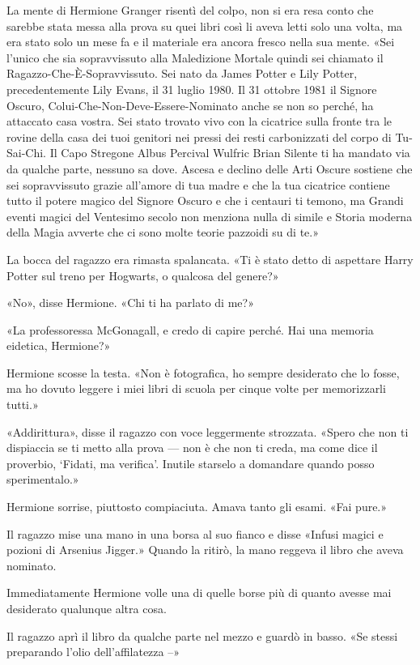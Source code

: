 La mente di Hermione Granger risentì del colpo, non si era resa conto che sarebbe stata messa alla prova su quei libri così li aveva letti solo una volta, ma era stato solo un mese fa e il materiale era ancora fresco nella sua mente. «Sei l’unico che sia sopravvissuto alla Maledizione Mortale quindi sei chiamato il Ragazzo-Che-È-Sopravvissuto. Sei nato da James Potter e Lily Potter, precedentemente Lily Evans, il 31 luglio 1980. Il 31 ottobre 1981 il Signore Oscuro, Colui-Che-Non-Deve-Essere-Nominato anche se non so perché, ha attaccato casa vostra. Sei stato trovato vivo con la cicatrice sulla fronte tra le rovine della casa dei tuoi genitori nei pressi dei resti carbonizzati del corpo di Tu-Sai-Chi. Il Capo Stregone Albus Percival Wulfric Brian Silente ti ha mandato via da qualche parte, nessuno sa dove. Ascesa e declino delle Arti Oscure sostiene che sei sopravvissuto grazie all’amore di tua madre e che la tua cicatrice contiene tutto il potere magico del Signore Oscuro e che i centauri ti temono, ma Grandi eventi magici del Ventesimo secolo non menziona nulla di simile e Storia moderna della Magia avverte che ci sono molte teorie pazzoidi su di te.»

La bocca del ragazzo era rimasta spalancata. «Ti è stato detto di aspettare Harry Potter sul treno per Hogwarts, o qualcosa del genere?»

«No», disse Hermione. «Chi ti ha parlato di me?»

«La professoressa McGonagall, e credo di capire perché. Hai una memoria eidetica, Hermione?»

Hermione scosse la testa. «Non è fotografica, ho sempre desiderato che lo fosse, ma ho dovuto leggere i miei libri di scuola per cinque volte per memorizzarli tutti.»

«Addirittura», disse il ragazzo con voce leggermente strozzata. «Spero che non ti dispiaccia se ti metto alla prova — non è che non ti creda, ma come dice il proverbio, ‘Fidati, ma verifica’. Inutile starselo a domandare quando posso sperimentalo.»

Hermione sorrise, piuttosto compiaciuta. Amava tanto gli esami. «Fai pure.»

Il ragazzo mise una mano in una borsa al suo fianco e disse «Infusi magici e pozioni di Arsenius Jigger.» Quando la ritirò, la mano reggeva il libro che aveva nominato.

Immediatamente Hermione volle una di quelle borse più di quanto avesse mai desiderato qualunque altra cosa.

Il ragazzo aprì il libro da qualche parte nel mezzo e guardò in basso. «Se stessi preparando l’olio dell’affilatezza –»

